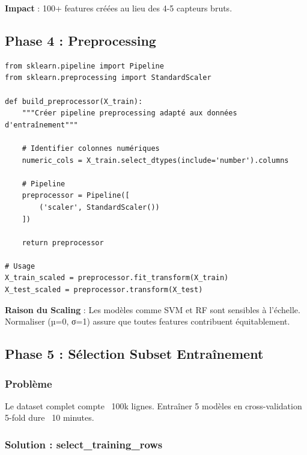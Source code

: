 \documentclass[12pt,a4paper,french]{article}
\begin{document}
\textbf{Impact} : 100+ features créées au lieu des 4-5 capteurs bruts.

\subsection{Phase 4 : Preprocessing}

\begin{lstlisting}
from sklearn.pipeline import Pipeline
from sklearn.preprocessing import StandardScaler

def build_preprocessor(X_train):
    """Créer pipeline preprocessing adapté aux données d'entraînement"""
    
    # Identifier colonnes numériques
    numeric_cols = X_train.select_dtypes(include='number').columns
    
    # Pipeline
    preprocessor = Pipeline([
        ('scaler', StandardScaler())
    ])
    
    return preprocessor

# Usage
X_train_scaled = preprocessor.fit_transform(X_train)
X_test_scaled = preprocessor.transform(X_test)
\end{lstlisting}

\textbf{Raison du Scaling} : Les modèles comme SVM et RF sont sensibles à l'échelle. Normaliser (µ=0, σ=1) assure que toutes features contribuent équitablement.

\subsection{Phase 5 : Sélection Subset Entraînement}

\subsubsection{Problème}

Le dataset complet compte ~100k lignes. Entraîner 5 modèles en cross-validation 5-fold dure ~10 minutes.

\subsubsection{Solution : select\_training\_rows}
\end{document}
